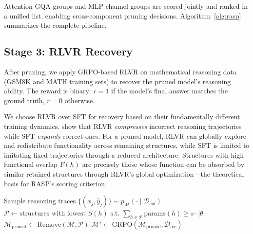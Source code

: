Attention GQA groups and MLP channel groups are scored jointly and ranked in a unified list, enabling cross-component pruning decisions.
Algorithm~\ref{alg:rasp} summarizes the complete pipeline.

\subsection{Stage 3: RLVR Recovery}
\label{sec:stage3}

After pruning, we apply GRPO-based RLVR on mathematical reasoning data (GSM8K and MATH training sets) to recover the pruned model's reasoning ability.
The reward is binary: $r = 1$ if the model's final answer matches the ground truth, $r = 0$ otherwise.

We choose RLVR over SFT for recovery based on their fundamentally different training dynamics.
\citet{rlsqueezes2026} show that RLVR \emph{compresses} incorrect reasoning trajectories while SFT \emph{expands} correct ones.
For a pruned model, RLVR can globally explore and redistribute functionality across remaining structures, while SFT is limited to imitating fixed trajectories through a reduced architecture.
Structures with high functional overlap $F(h)$ are precisely those whose function can be absorbed by similar retained structures through RLVR's global optimization---the theoretical basis for RASP's scoring criterion.

\begin{algorithm}[t]
\caption{Recovery-Aware Structured Pruning (RASP)}
\label{alg:rasp}
\SetAlgoLined
{}
\BlankLine
{}
Sample reasoning traces $\{(x_j, \hat{y}_j)\} \sim p_\mathcal{M}(\cdot \mid \mathcal{D}_\text{cal})$\;
\BlankLine
{}
$\mathcal{P} \gets \text{structures with lowest } S(h) \text{ s.t. } \sum_{h \in \mathcal{P}} \text{params}(h) \ge s \cdot |\theta|$\;
$\mathcal{M}_\text{pruned} \gets \text{Remove}(\mathcal{M}, \mathcal{P})$\;
\BlankLine
{}
$\mathcal{M}' \gets \text{GRPO}(\mathcal{M}_\text{pruned}, \mathcal{D}_\text{rec})$\;
\end{algorithm}
